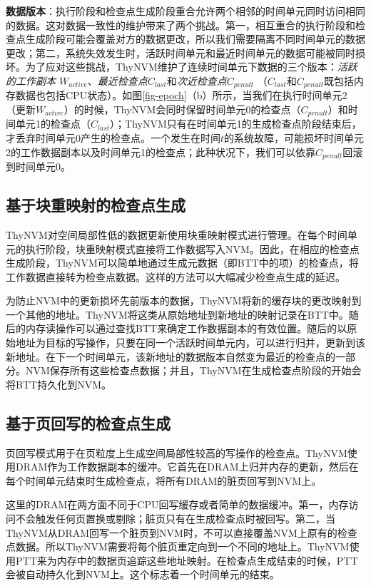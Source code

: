 \textbf{数据版本}：执行阶段和检查点生成阶段重合允许两个相邻的时间单元同时访问相同的数据。这对数据一致性的维护带来了两个挑战。第一，相互重合的执行阶段和检查点生成阶段可能会覆盖对方的数据更改，所以我们需要隔离不同时间单元的数据更改；第二，系统失效发生时，活跃时间单元和最近时间单元的数据可能被同时损坏。为了应对这些挑战，ThyNVM维护了连续时间单元下数据的三个版本：\emph{活跃的工作副本 $W_{active}$}、\emph{最近检查点$C_{last}$}和\emph{次近检查点$C_{penult}$} （$C_{last}$和$C_{penult}$既包括内存数据也包括CPU状态）。如图\ref{fig-epoch}（b）所示，当我们在执行时间单元2（更新$W_{active}$）的时候，ThyNVM会同时保留时间单元0的检查点（$C_{penult}$）和时间单元1的检查点（$C_{last}$）；ThyNVM只有在时间单元1的生成检查点阶段结束后，才丢弃时间单元0产生的检查点。一个发生在时间$t$的系统故障，可能损坏时间单元2的工作数据副本以及时间单元1的检查点；此种状况下，我们可以依靠$C_{penult}$回滚到时间单元0。

\subsection{基于块重映射的检查点生成}
\label{subsec:block-remap}

ThyNVM对空间局部性低的数据更新使用块重映射模式进行管理。在每个时间单元的执行阶段，块重映射模式直接将工作数据写入NVM。因此，在相应的检查点生成阶段，ThyNVM可以简单地通过生成元数据（即BTT中的项）的检查点，将工作数据直接转为检查点数据。这样的方法可以大幅减少检查点生成的延迟。

为防止NVM中的更新损坏先前版本的数据，ThyNVM将新的缓存块的更改映射到一个其他的地址。ThyNVM将这类从原始地址到新地址的映射记录在BTT中。随后的内存读操作可以通过查找BTT来确定工作数据副本的有效位置。随后的以原始地址为目标的写操作，只要在同一个活跃时间单元内，可以进行归并，更新到该新地址。在下一个时间单元，该新地址的数据版本自然变为最近的检查点的一部分。NVM保存所有这些检查点数据；并且，ThyNVM在生成检查点阶段的开始会将BTT持久化到NVM。

\subsection{基于页回写的检查点生成}
\label{subsec:page-writeback}

页回写模式用于在页粒度上生成空间局部性较高的写操作的检查点。ThyNVM使用DRAM作为工作数据副本的缓冲。它首先在DRAM上归并内存的更新，然后在每个时间单元结束时生成检查点，将所有DRAM的脏页回写到NVM上。

这里的DRAM在两方面不同于CPU回写缓存或者简单的数据缓冲。第一，内存访问不会触发任何页置换或剔除；脏页只有在生成检查点时被回写。第二，当ThyNVM从DRAM回写一个脏页到NVM时，不可以直接覆盖NVM上原有的检查点数据。所以ThyNVM需要将每个脏页重定向到一个不同的地址上。ThyNVM使用PTT来为内存中的数据页追踪这些地址映射。在检查点生成结束的时候，PTT会被自动持久化到NVM上。这个标志着一个时间单元的结束。

